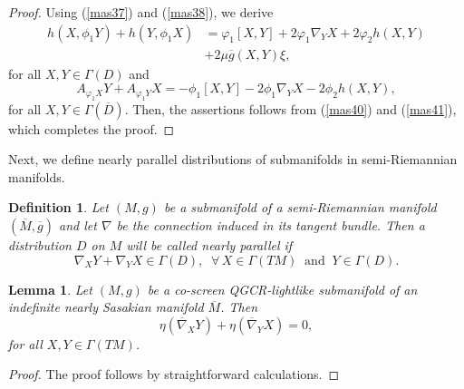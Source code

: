 \documentclass[reqno, 12pt]{amsart}
\numberwithin{equation}{section}
\newtheorem{lemma}[theorem]{Lemma}
\newtheorem{definition}[theorem]{Definition}
\begin{document}
\begin{proof}
 Using (\ref{mas37}) and (\ref{mas38}), we derive 
 \begin{align}\label{mas40}
         h(X,\phi_{1}Y)+h(Y,\phi_{1}X)&=\varphi_{1}[X,Y]+2\varphi_{1}\nabla_{Y}X+2\varphi_{2} h(X,Y)\nonumber\\
         &+2\mu\overline{g}(X,Y)\xi,
       \end{align}
 for all $X,Y\in\Gamma(D)$ and 
 \begin{equation}\label{mas41}
        A_{\varphi_{1}X}Y+A_{\varphi_{1}Y}X=-\phi_{1}[X,Y]-2\phi_{1}\nabla_{Y}X-2\phi_{2}h(X,Y),
  \end{equation}
 for all $X,Y\in\Gamma(\overline{D})$. Then, the assertions follows from (\ref{mas40}) and (\ref{mas41}), which completes the proof.

\end{proof}
Next, we define nearly parallel distributions of submanifolds in semi-Riemannian manifolds.
\begin{definition}\label{defn3}
 Let $(M,g)$ be a submanifold of a semi-Riemannian manifold $(\overline{M},\overline{g})$ and let $\nabla$  be the connection induced in its tangent bundle. Then a distribution $D$ on $M$ will be called nearly parallel if 
       \begin{equation}\nonumber
       \nabla_{X}Y+\nabla_{Y}X\in\Gamma(D),\;\; \forall \,X\in\Gamma(TM) \;\;\mbox{and}\;\; Y\in\Gamma(D).                                                                                                                                                                                                                                                                                                                                                                                                                                           \end{equation}
 \end{definition}
 \begin{lemma}\label{lemma5}
  Let $(M,g)$ be a co-screen QGCR-lightlike submanifold of an indefinite nearly Sasakian manifold $\overline{M}$. Then
  \begin{equation}\nonumber
   \eta(\overline{\nabla}_{X}Y)+\eta(\overline{\nabla}_{Y}X)=0,
  \end{equation}
 for all $X,Y\in\Gamma(TM)$.
 \end{lemma}
\begin{proof}
 The proof follows by straightforward calculations.
\end{proof}
\end{document}
